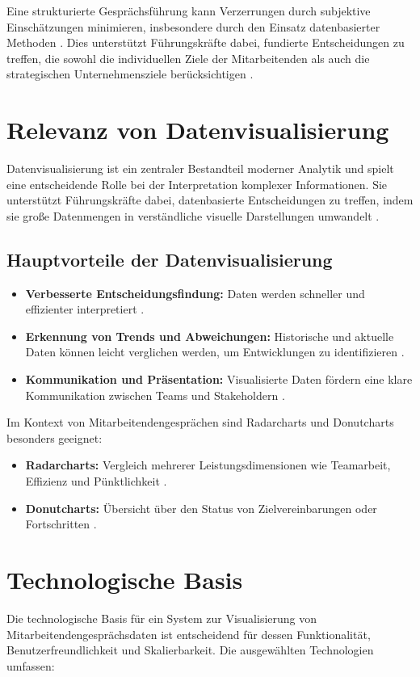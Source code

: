 Eine strukturierte Gesprächsführung kann Verzerrungen durch subjektive Einschätzungen minimieren, insbesondere durch den Einsatz datenbasierter Methoden \cite{heikkila2018}. Dies unterstützt Führungskräfte dabei, fundierte Entscheidungen zu treffen, die sowohl die individuellen Ziele der Mitarbeitenden als auch die strategischen Unternehmensziele berücksichtigen \cite{barton2012}.

\section{Relevanz von Datenvisualisierung}
Datenvisualisierung ist ein zentraler Bestandteil moderner Analytik und spielt eine entscheidende Rolle bei der Interpretation komplexer Informationen. Sie unterstützt Führungskräfte dabei, datenbasierte Entscheidungen zu treffen, indem sie große Datenmengen in verständliche visuelle Darstellungen umwandelt \cite{kirk2016data}. 

\subsection*{Hauptvorteile der Datenvisualisierung}
\begin{itemize}
    \item \textbf{Verbesserte Entscheidungsfindung:} Daten werden schneller und effizienter interpretiert \cite{kirk2016data}.
    \item \textbf{Erkennung von Trends und Abweichungen:} Historische und aktuelle Daten können leicht verglichen werden, um Entwicklungen zu identifizieren \cite{ware2012information}.
    \item \textbf{Kommunikation und Präsentation:} Visualisierte Daten fördern eine klare Kommunikation zwischen Teams und Stakeholdern \cite{evergreen2016effective}.
\end{itemize}

Im Kontext von Mitarbeitendengesprächen sind Radarcharts und Donutcharts besonders geeignet:
\begin{itemize}
    \item \textbf{Radarcharts:} Vergleich mehrerer Leistungsdimensionen wie Teamarbeit, Effizienz und Pünktlichkeit \cite{heikkila2018}.
    \item \textbf{Donutcharts:} Übersicht über den Status von Zielvereinbarungen oder Fortschritten \cite{evergreen2016effective}.
\end{itemize}
\newpage

\section{Technologische Basis}
Die technologische Basis für ein System zur Visualisierung von Mitarbeitendengesprächsdaten ist entscheidend für dessen Funktionalität, Benutzerfreundlichkeit und Skalierbarkeit. Die ausgewählten Technologien umfassen:

